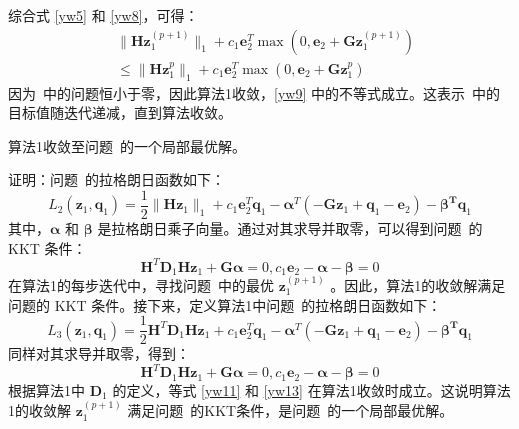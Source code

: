综合式 \eqref{yw5} 和 \eqref{yw8}，可得：
\begin{equation}
\begin{aligned}
&\|\mathbf{Hz}^{(p+1)}_{1}\|_{1}+c_{1}\mathbf{e}^{T}_{2}\mathop{\max}(0,\mathbf{e}_{2}+\mathbf{Gz}^{(p+1)}_{1})\\
&\le\|\mathbf{Hz}^{p}_{1}\|_{1}+c_{1}\mathbf{e}^{T}_{2}\mathop{\max}(0,\mathbf{e}_{2}+\mathbf{Gz}^{p}_{1})
\end{aligned}
\label{yw9}
\end{equation}
因为\ 中的问题恒小于零，因此算法1收敛，\eqref{yw9} 中的不等式成立。这表示\ 中的目标值随迭代递减，直到算法收敛。
\begin{theorem}
算法1收敛至问题\ 的一个局部最优解。
\end{theorem}
证明：问题\ 的拉格朗日函数如下：
\begin{equation}
L_{2}(\mathbf{z}_{1},\mathbf{q}_{1})=\frac{1}{2}\|\mathbf{Hz}_{1}\|_{1}+
c_{1}\mathbf{e}^{T}_{2}\mathbf{q}_{1}-\mathbf{\alpha}^{T}(-\mathbf{Gz}_{1}+\mathbf{q}_{1}-\mathbf{e}_{2})
-\mathbf{\beta^{T}q}_{1}
\label{yw10}
\end{equation}
其中，$\mathbf{\alpha}$ 和 $\mathbf{\beta}$ 是拉格朗日乘子向量。通过对其求导并取零，可以得到问题\ 的 KKT 条件：
\begin{equation}
\mathbf{H}^{T}\mathbf{D}_{1}\mathbf{Hz}_{1}+\mathbf{G\alpha}=0,
c_{1}\mathbf{e}_{2}-\mathbf{\alpha}-\mathbf{\beta}=0
\label{yw11}
\end{equation}
在算法1的每步迭代中，寻找问题\ 中的最优 $\mathbf{z}^{(p+1)}_{1}$ 。因此，算法1的收敛解满足问题的 KKT 条件。接下来，定义算法1中问题\ 的拉格朗日函数如下：
\begin{equation}
L_{3}(\mathbf{z}_{1},\mathbf{q}_{1})=\frac{1}{2}\mathbf{H}^{T}\mathbf{D}_{1}\mathbf{Hz}_{1}+
c_{1}\mathbf{e}^{T}_{2}\mathbf{q}_{1}-\mathbf{\alpha}^{T}(-\mathbf{Gz}_{1}+\mathbf{q}_{1}-\mathbf{e}_{2})
-\mathbf{\beta^{T}q}_{1}
\label{yw12}
\end{equation}
同样对其求导并取零，得到：
\begin{equation}
\mathbf{H}^{T}\mathbf{D}_{1}\mathbf{Hz}_{1}+\mathbf{G\alpha}=0,
c_{1}\mathbf{e}_{2}-\mathbf{\alpha}-\mathbf{\beta}=0
\label{yw13}
\end{equation}
根据算法1中 $\mathbf{D}_{1}$ 的定义，等式 \eqref{yw11} 和 \eqref{yw13} 在算法1收敛时成立。这说明算法1的收敛解 $\mathbf{z}^{(p+1)}_{1}$ 满足问题\ 的KKT条件，是问题\ 的一个局部最优解。
